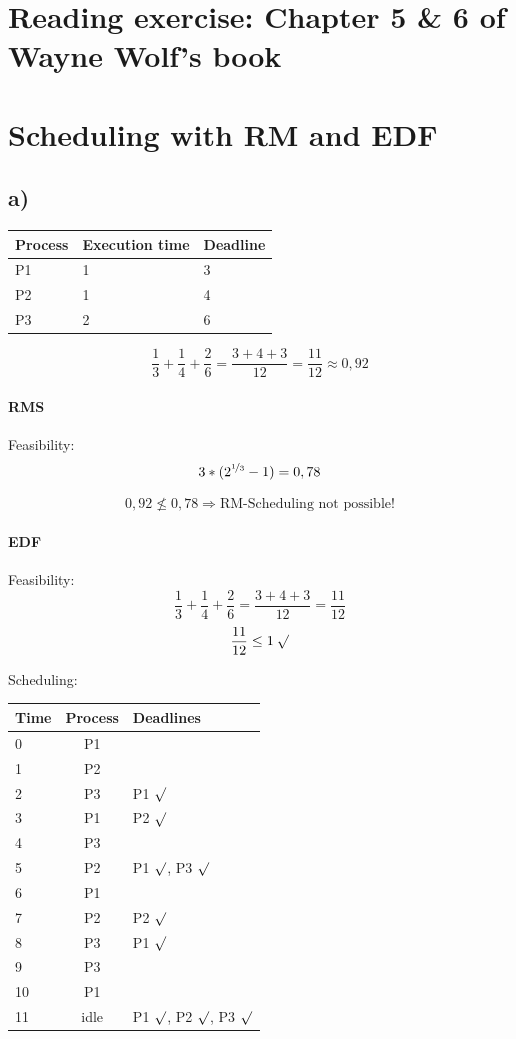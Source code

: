 \documentclass[a4paper,10pt]{scrartcl}
\begin{document}
\section{Reading exercise: Chapter 5 \& 6 of Wayne Wolf’s book}

\section{Scheduling with RM and EDF}
\subsection{a)}
\begin{center}
\begin{tabular}{|l|l|l|}
\hline
\textbf{Process} & \textbf{Execution time} & \textbf{Deadline} \\ 
\hline 
P1 & 1 & 3 \\ 
 
P2 & 1 & 4 \\

P3 & 2 & 6 \\
\hline
\end{tabular} 
\end{center}
$$ \dfrac{1}{3}+ \dfrac{1}{4} + \dfrac{2}{6} = \dfrac{3+4+3}{12} = \dfrac{11}{12} \approx 0,92 $$
\paragraph{RMS} 
Feasibility:
$$ 3 *(2^{\nicefrac{1}{3}}-1) = 0,78 $$

$$ 0,92 \nleq 0,78 \Rightarrow \textrm{RM-Scheduling not possible!} $$
\paragraph{EDF}  
Feasibility:
$$ \dfrac{1}{3}+ \dfrac{1}{4} + \dfrac{2}{6} = \dfrac{3+4+3}{12} = \dfrac{11}{12}$$
$$ \dfrac{11}{12} \leq 1 \: \surd $$

Scheduling:
\begin{center}
\begin{tabular}{|l|c|l|}
\hline 
\textbf{Time} & \textbf{Process} & \textbf{Deadlines} \\ 
\hline 
0 & P1 &  \\ 
1 & P2 &  \\ 
2 & P3 & P1 $\surd$ \\ 
3 & P1 & P2 $\surd$\\ 
4 & P3 &  \\ 
5 & P2 & P1 $\surd$, P3 $\surd$ \\ 
6 & P1 &  \\ 
7 & P2 & P2 $\surd$ \\ 
8 & P3 & P1 $\surd$\\ 
9 & P3 &  \\ 
10 &P1 &  \\ 
11 & idle & P1 $\surd$, P2 $\surd$, P3 $\surd$ \\ 
\hline 
\end{tabular} 
\end{center}
\end{document}

